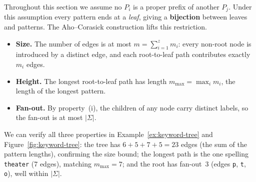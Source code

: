 \begin{remark}
  Throughout this section we assume no $P_i$ is a proper prefix of another
  $P_j$.
  Under this assumption every pattern ends at a \textit{leaf}, giving a
  \textbf{bijection} between leaves and patterns.
  The Aho--Corasick construction lifts this restriction.
\end{remark}


\begin{observation}\leavevmode
  \begin{itemize}[leftmargin=1.6em, itemsep=2pt]
    \item \textbf{Size.}  The number of edges is at most
          $m = \sum_{i=1}^{z} m_i$:
          every non-root node is introduced by a distinct edge, and
          each root-to-leaf path contributes exactly $m_i$ edges.
    \item \textbf{Height.}  The longest root-to-leaf path has length
          $m_{\max} = \max_i m_i$, the length of the longest pattern.
    \item \textbf{Fan-out.}  By property~(i), the children of any node carry
          distinct labels, so the fan-out is at most $|\Sigma|$.
  \end{itemize}
\end{observation}

We can verify all three properties in
Example~\ref{ex:keyword-tree} and Figure~\ref{fig:keyword-tree}:
the tree has $6+5+7+5 = 23$ edges (the sum of the pattern lengths),
confirming the size bound;
the longest path is the one spelling \texttt{theater} (7 edges),
matching $m_{\max} = 7$;
and the root has fan-out~3 (edges \texttt{p}, \texttt{t}, \texttt{o}),
well within $|\Sigma|$.

